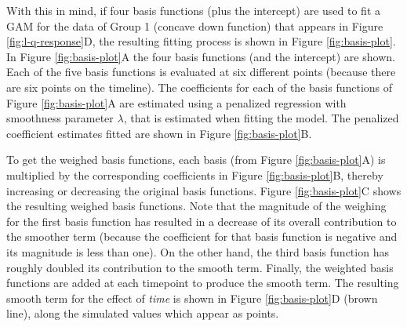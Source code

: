 \documentclass[
]{article}
\begin{document}
With this in mind, if four basis functions (plus the intercept) are used to fit a GAM for the data of Group 1 (concave down function) that appears in Figure \ref{fig:l-q-response}D, the resulting fitting process is shown in Figure \ref{fig:basis-plot}. In Figure \ref{fig:basis-plot}A the four basis functions (and the intercept) are shown. Each of the five basis functions is evaluated at six different points (because there are six points on the timeline). The coefficients for each of the basis functions of Figure \ref{fig:basis-plot}A are estimated using a penalized regression with smoothness parameter \(\lambda\), that is estimated when fitting the model. The penalized coefficient estimates fitted are shown in Figure \ref{fig:basis-plot}B.

To get the weighed basis functions, each basis (from Figure \ref{fig:basis-plot}A) is multiplied by the corresponding coefficients in Figure \ref{fig:basis-plot}B, thereby increasing or decreasing the original basis functions. Figure \ref{fig:basis-plot}C shows the resulting weighed basis functions. Note that the magnitude of the weighing for the first basis function has resulted in a decrease of its overall contribution to the smoother term (because the coefficient for that basis function is negative and its magnitude is less than one). On the other hand, the third basis function has roughly doubled its contribution to the smooth term. Finally, the weighted basis functions are added at each timepoint to produce the smooth term. The resulting smooth term for the effect of \emph{time} is shown in Figure \ref{fig:basis-plot}D (brown line), along the simulated values which appear as points.
\end{document}
